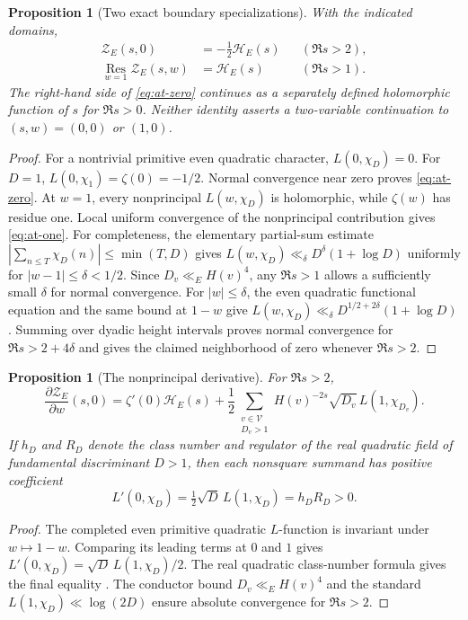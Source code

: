 \documentclass[11pt]{article}
\newtheorem{proposition}[theorem]{Proposition}
\newcommand{\calV}{\mathcal{V}}
\newcommand{\Res}{\operatorname*{Res}}
\begin{document}
\begin{proposition}[Two exact boundary specializations]\label{prop:twoslices}
With the indicated domains,
\begin{align}
 \mathcal Z_E(s,0)&=-\tfrac12\mathcal H_E(s)
       &&(\Re s>2),\label{eq:at-zero}\\
 \Res_{w=1}\mathcal Z_E(s,w)&=\mathcal H_E(s)
       &&(\Re s>1).\label{eq:at-one}
\end{align}
The right-hand side of \eqref{eq:at-zero} continues as a separately defined holomorphic function of $s$ for $\Re s>0$.  Neither identity asserts a two-variable continuation to $(s,w)=(0,0)$ or $(1,0)$.
\end{proposition}
\begin{proof}
For a nontrivial primitive even quadratic character, $L(0,\chi_D)=0$.  For $D=1$, $L(0,\chi_1)=\zeta(0)=-1/2$.  Normal convergence near zero proves \eqref{eq:at-zero}.  At $w=1$, every nonprincipal $L(w,\chi_D)$ is holomorphic, while $\zeta(w)$ has residue one.  Local uniform convergence of the nonprincipal contribution gives \eqref{eq:at-one}.  For completeness, the elementary partial-sum estimate $|\sum_{n\le T}\chi_D(n)|\le\min(T,D)$ gives $L(w,\chi_D)\ll_\delta D^\delta(1+\log D)$ uniformly for $|w-1|\le\delta<1/2$.  Since $D_v\ll_EH(v)^4$, any $\Re s>1$ allows a sufficiently small $\delta$ for normal convergence. For $|w|\le\delta$, the even quadratic functional equation and the same bound at $1-w$ give $L(w,\chi_D)\ll_\delta D^{1/2+2\delta}(1+\log D)$. Summing over dyadic height intervals proves normal convergence for $\Re s>2+4\delta$ and gives the claimed neighborhood of zero whenever $\Re s>2$.
\end{proof}

\begin{proposition}[The nonprincipal derivative]\label{prop:class-number}
For $\Re s>2$,
\begin{equation}\label{eq:wderivative}
 \frac{\partial\mathcal Z_E}{\partial w}(s,0)
 =\zeta'(0)\mathcal H_E(s)
 +\frac12\sum_{\substack{v\in\calV\\D_v>1}}
 H(v)^{-2s}\sqrt{D_v}\,L(1,\chi_{D_v}).
\end{equation}
If $h_D$ and $R_D$ denote the class number and regulator of the real quadratic field of fundamental discriminant $D>1$, then each nonsquare summand has positive coefficient
\begin{equation}\label{eq:class-number}
 L'(0,\chi_D)=\tfrac12\sqrt D\,L(1,\chi_D)=h_DR_D>0.
\end{equation}
\end{proposition}
\begin{proof}
The completed even primitive quadratic $L$-function is invariant under $w\mapsto1-w$.  Comparing its leading terms at $0$ and $1$ gives $L'(0,\chi_D)=\sqrt D\,L(1,\chi_D)/2$.  The real quadratic class-number formula gives the final equality \cite{DirichletClass,HeckeTate}.  The conductor bound $D_v\ll_EH(v)^4$ and the standard $L(1,\chi_D)\ll\log(2D)$ ensure absolute convergence for $\Re s>2$.
\end{proof}
\end{document}
